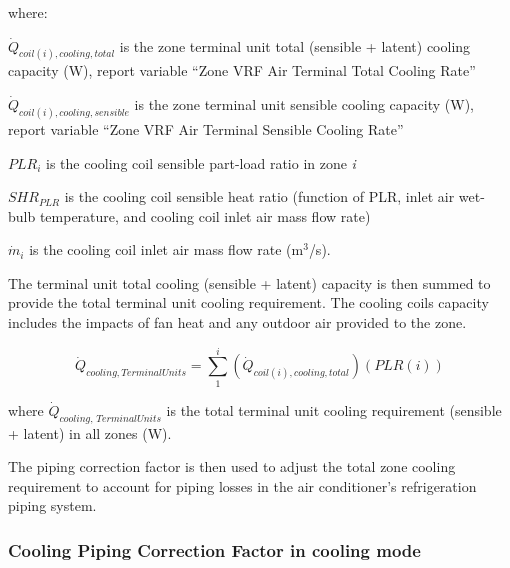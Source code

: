 where:

\(\dot{Q}_{coil(i),cooling,total}\) is the zone terminal unit total (sensible + latent) cooling capacity (W), report variable ``Zone VRF Air Terminal Total Cooling Rate''

\(\dot{Q}_{coil(i),cooling,sensible}\) is the zone terminal unit sensible cooling capacity (W), report variable ``Zone VRF Air Terminal Sensible Cooling Rate''

\(PLR_i\) is the cooling coil sensible part-load ratio in zone \emph{i}

\(SHR_{PLR}\) is the cooling coil sensible heat ratio (function of PLR, inlet air wet-bulb temperature, and cooling coil inlet air mass flow rate)

\(\dot{m}_{i}\) is the cooling coil inlet air mass flow rate (m\(^3\)/s).

The terminal unit total cooling (sensible + latent) capacity is then summed to provide the total terminal unit cooling requirement. The cooling coils capacity includes the impacts of fan heat and any outdoor air provided to the zone.

\begin{equation}
  \dot{Q}_{cooling,TerminalUnits} = \sum\limits_1^i \left( \dot{Q}_{coil(i),cooling,total} \right) \left( PLR(i) \right)
\end{equation}

where \(\dot{Q}_{cooling,\,TerminalUnits}\) is the total terminal unit cooling requirement (sensible + latent) in all zones (W).

The piping correction factor is then used to adjust the total zone cooling requirement to account for piping losses in the air conditioner's refrigeration piping system.

\subsubsection{Cooling Piping Correction Factor in cooling mode}\label{cooling-piping-correction-factor-in-cooling-mode}

